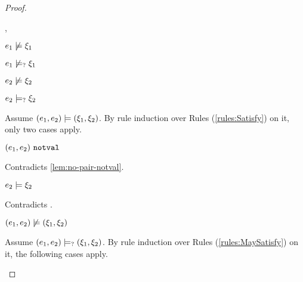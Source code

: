 \begin{proof}
\begin{byCases}
\begin{byCases}
\begin{byCases}
        \item[\cnotsatisfyormay{e_1}{\xi_1},\cmaysatisfy{e_2}{\xi_2}]
            \begin{pfsteps*}
            \item $e_1 \not\models \xi_1$  
            \item $e_1 \not\models_{?} \xi_1$  
            \item $e_2 \not\models \xi_2$  
            \item $e_2 \models_{?} \xi_2$  
            \end{pfsteps*}
            Assume $(e_1 , e_2) \models (\xi_1 , \xi_2)$. By rule induction over Rules (\ref{rules:Satisfy}) on it, only two cases apply. 
           \begin{byCases}
            \item[\text{(\ref{rule:CSNotValPair})}]
                \begin{pfsteps*}
                \item $(e_1 , e_2) ~\mathtt{notval}$ 
                \end{pfsteps*}
                Contradicts \autoref{lem:no-pair-notval}.
            \item[\text{(\ref{rule:CSPair})}]
                \begin{pfsteps*}
                \item $e_2 \models \xi_2$ 
                \end{pfsteps*}
                Contradicts .
            \end{byCases}
            \begin{pfsteps*}
            \item $(e_1 , e_2) \not\models (\xi_1 , \xi_2)$  
            \end{pfsteps*}
            Assume $(e_1 , e_2) \models_{?} (\xi_1 , \xi_2)$. By rule induction over Rules (\ref{rules:MaySatisfy}) on it, the following cases apply.
            \begin{byCases}
            \item[\text{(\ref{rule:CMSNotVal})}]
                \begin{pfsteps*}

\end{pfsteps*}
\end{byCases}
\end{byCases}
\end{byCases}
\end{byCases}
\end{proof}
